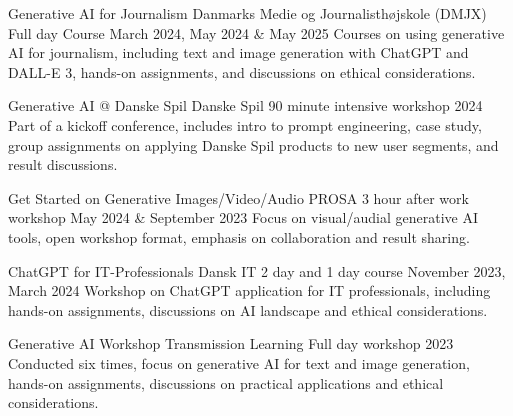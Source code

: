 \begin{cventries}
\cventry
{Generative AI for Journalism} %
{Danmarks Medie og Journalisthøjskole (DMJX)} %
{Full day Course} %
{March 2024, May 2024 \& May 2025} %
{
  Courses on using generative AI for journalism, including text and image generation with ChatGPT and DALL-E 3, hands-on assignments, and discussions on ethical considerations.
}

\cventry
{Generative AI @ Danske Spil} %
{Danske Spil} %
{90 minute intensive workshop} %
{2024} %
{
  Part of a kickoff conference, includes intro to prompt engineering, case study, group assignments on applying Danske Spil products to new user segments, and result discussions.
}

\cventry
{Get Started on Generative Images/Video/Audio} %
{PROSA} %
{3 hour after work workshop} %
{May 2024 \& September 2023} %
{
  Focus on visual/audial generative AI tools, open workshop format, emphasis on collaboration and result sharing.
}

\cventry
{ChatGPT for IT-Professionals} %
{Dansk IT} %
{2 day and 1 day course} %
{November 2023, March 2024} %
{
  Workshop on ChatGPT application for IT professionals, including hands-on assignments, discussions on AI landscape and ethical considerations.
}

\cventry
{Generative AI Workshop} %
{Transmission Learning} %
{Full day workshop} %
{2023} %
{
  Conducted six times, focus on generative AI for text and image generation, hands-on assignments, discussions on practical applications and ethical considerations.
}


\end{cventries}